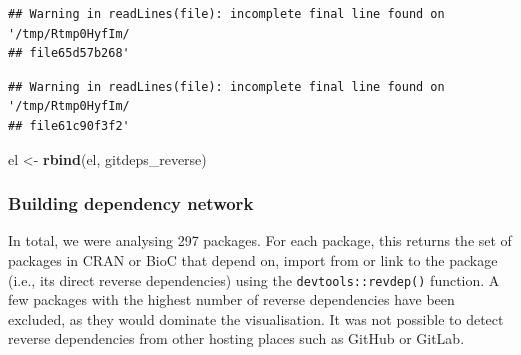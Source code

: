 \documentclass[]{article}
\newenvironment{Shaded}{\begin{snugshade}}{\end{snugshade}}
\newcommand{\DataTypeTok}[1]{\textcolor[rgb]{0.13,0.29,0.53}{#1}}
\newcommand{\KeywordTok}[1]{\textcolor[rgb]{0.13,0.29,0.53}{\textbf{#1}}}
\newcommand{\NormalTok}[1]{#1}
\newcommand{\OperatorTok}[1]{\textcolor[rgb]{0.81,0.36,0.00}{\textbf{#1}}}
\newcommand{\StringTok}[1]{\textcolor[rgb]{0.31,0.60,0.02}{#1}}
\begin{document}
\begin{Shaded}
\end{Shaded}

\begin{verbatim}
## Warning in readLines(file): incomplete final line found on '/tmp/Rtmp0HyfIm/
## file65d57b268'
\end{verbatim}

\begin{verbatim}
## Warning in readLines(file): incomplete final line found on '/tmp/Rtmp0HyfIm/
## file61c90f3f2'
\end{verbatim}

\begin{Shaded}
\begin{Highlighting}[]
\NormalTok{el <-}\StringTok{ }\KeywordTok{rbind}\NormalTok{(el, gitdeps_reverse)}
\end{Highlighting}
\end{Shaded}

\hypertarget{building-dependency-network}{%
\subsubsection*{Building dependency network}\label{building-dependency-network}}

In total, we were analysing 297 packages.
For each package, this returns the set of packages in CRAN or BioC that depend on, import from or link to the package (i.e., its direct reverse dependencies) using the \texttt{devtools::revdep()} function. A few packages with the highest number of reverse dependencies have been excluded, as they would dominate the visualisation.
It was not possible to detect reverse dependencies from other hosting places such as GitHub or GitLab.
\end{document}
